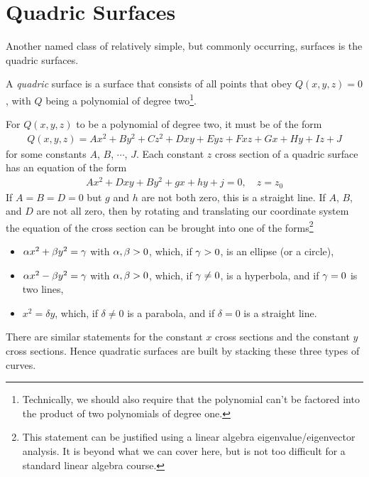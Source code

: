 \section{Quadric Surfaces}\label{sec quadrics}


Another named class of relatively simple, but commonly occurring, 
surfaces is the quadric surfaces.

\begin{defn}[Quadrics]\label{def quadric}
A \emph{quadric} surface is a surface that consists of all points that
obey $Q(x,y,z)=0$, with $Q$ being a polynomial of degree two\footnote{Technically, we should also require that the polynomial
can't be factored into the product of two polynomials of degree one.}. 
\end{defn}
For $Q(x,y,z)$ to be a polynomial of degree two, it must be of the form
\begin{align*}
Q(x,y,z) = Ax^2 +By^2 +Cz^2 +Dxy +Eyz +Fxz +Gx +Hy +Iz +J
\end{align*}
for some constants $A$, $B$, $\cdots$, $J$. Each constant $z$ cross section
of a quadric surface has an equation of the form
\begin{align*}
Ax^2 + Dxy +By^2 +gx +hy +j =0,\quad z=z_0
\end{align*}
If $A=B=D=0$ but $g$ and $h$ are not both zero, this is a straight line.
If $A$, $B$, and $D$ are not all zero, then by rotating and translating 
our coordinate system the equation of the cross section can be brought
into one of the forms\footnote{This statement can be justified using a 
linear algebra eigenvalue/eigenvector analysis. It is 
beyond what we can cover here, but is not too difficult for a standard 
linear algebra course.}
\begin{itemize}
\item
$\alpha x^2 + \beta y^2 =\gamma$ with $\alpha,\beta>0$, which, if $\gamma>0$, is an ellipse
(or a circle),
\item
$\alpha x^2 - \beta y^2 =\gamma$ with $\alpha,\beta>0$, which, if $\gamma\ne0$, is a hyperbola,
and if $\gamma=0$ is two lines,
\item 
$x^2 = \delta y$, which, if $\delta\ne 0$ is a parabola, and if $\delta=0$ is a straight line.
\end{itemize}
There are similar statements for the constant $x$ cross sections and the
constant $y$ cross sections. Hence quadratic surfaces are built by stacking
these three types of curves.

